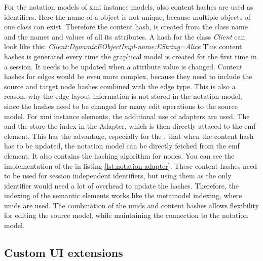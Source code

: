   For the notation models of \ac{xmi} instance models, also content hashes are used as identifiers. Here the name of a object is not unique, because multiple objects of one class can exist. Therefore the content hash, is created from the class name and the names and values of all its attributes. A hash for the class \textit{Client} can look like this: \textit{Client:DynamicEObjectImpl-name:EString=Alice} This content hashes is generated every time the graphical model is created for the first time in a session. It needs to be updated when a attribute value is changed. Content hashes for edges would be even more complex, because they need to include the source and target node hashes combined with the edge type. This is also a reason, why the edge layout information is not stored in the notation model, since the hashes need to be changed for many edit operations to the source model. For \ac{xmi} instance elements, the additional use of adapters are used. The  and the  store the index in the Adapter, which is then directly attaced to the \ac{emf} element. This has the advantage, especially for the , that when the content hash has to be updated, the notation model can be directly fetched from the \ac{emf} element. It also contains the hashing algorithm for nodes. You can see the implementation of the  in listing \ref{lst:notation-adapter}. These content hashes need to be used for session independent identifiers, but using them as the only identifier would need a lot of overhead to update the hashes. Therefore, the indexing of the semantic elements works like the metamodel indexing, where \acp{uuid} are used. 
  The combination of the \acp{uuid} and content hashes allows flexibility for editing the source model, while maintaining the connection to the notation model.

  \subsection{Custom UI extensions}
  \label{subsec:custom-ui-extensions}

